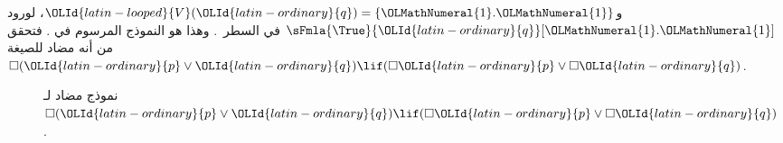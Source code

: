 \documentclass[../../../include/open-logic-section]{subfiles}
\begin{document}
{\begin{ex}
  و${\OLId{latin-looped}{V}}({\OLId{latin-ordinary}{q}}) = \{{\OLMathNumeral{1}}.{\OLMathNumeral{1}}\}$، لورود
  $\sFmla{\True}{{\OLId{latin-ordinary}{q}}}[{\OLMathNumeral{1}}.{\OLMathNumeral{1}}]$ في السطر~. وهذا هو النموذج المرسوم في
  . فتحقق من أنه مضاد للصيغة
  $\Box({\OLId{latin-ordinary}{p}} \lor {\OLId{latin-ordinary}{q}}) \lif (\Box {\OLId{latin-ordinary}{p}} \lor \Box {\OLId{latin-ordinary}{q}})$.
  \begin{figure}
  \begin{center}
  \end{center}
  \caption{نموذج مضاد لـ$\Box({\OLId{latin-ordinary}{p}} \lor {\OLId{latin-ordinary}{q}}) \lif (\Box {\OLId{latin-ordinary}{p}} \lor \Box {\OLId{latin-ordinary}{q}})$.}
\end{figure}
\end{ex}          
}
\end{document}

